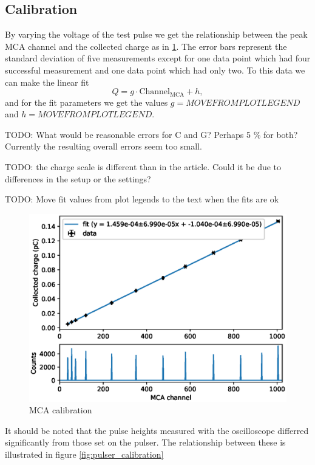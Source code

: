 \documentclass[a4paper]{article}
\begin{document}
\subsection{Calibration}
\label{results_calibration}
By varying the voltage of the test pulse we get the relationship between the peak MCA channel and the collected charge as in \ref{fig:mca_calibration}.
The error bars represent the standard deviation of five measurements except for one data point which had four successful measurement and one data point which had only two.
To this data we can make the linear fit
\begin{equation}
Q = g \cdot \text{Channel}_\text{MCA} + h,
\end{equation}
and for the fit parameters we get the values $g = MOVEFROMPLOTLEGEND$ and $h = MOVEFROMPLOTLEGEND$.

TODO: What would be reasonable errors for C and G?
Perhaps 5 \% for both?
Currently the resulting overall errors seem too small.

TODO: the charge scale is different than in the article.
Could it be due to differences in the setup or the settings?

TODO: Move fit values from plot legends to the text when the fits are ok

\begin{figure}[ht!]
\centering
\includegraphics[width=\textwidth]{fig/python/mca_calibration.eps}
\caption{MCA calibration}
\label{fig:mca_calibration}
\end{figure}

It should be noted that the pulse heights measured with the oscilloscope differred significantly from those set on the pulser.
The relationship between these is illustrated in figure \ref{fig:pulser_calibration}
\end{document}
